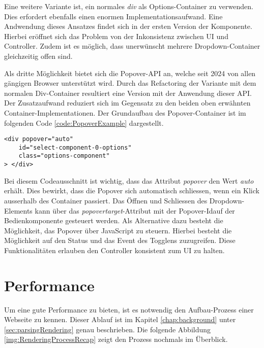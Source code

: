 Eine weitere Variante ist, ein normales \emph{div} als Options-Container zu verwenden.
Dies erfordert ebenfalls einen enormen Implementationsaufwand.
Eine Andwendung dieses Ansatzes findet sich in der ersten Version der Komponente.
Hierbei eröffnet sich das Problem von der Inkonsistenz zwischen UI und Controller.
Zudem ist es möglich, dass unerwünscht mehrere Dropdown-Container gleichzeitig offen sind.

Als dritte Möglichkeit bietet sich die Popover-API an, welche seit 2024 von allen gängigen Browser unterstützt wird.
Durch das Refactoring der Variante mit dem normalen Div-Container resultiert eine Version mit der Anwendung dieser API.
Der Zusatzaufwand reduziert sich im Gegensatz zu den beiden oben erwähnten Container-Implementationen.
Der Grundaufbau des Popover-Container ist im folgenden Code \ref{code:PopoverExample} dargestellt.

\begin{lstlisting}[style = htmlcssjs, caption = Popover-Container Beispiel, label = code:PopoverExample]
<div popover="auto"
    id="select-component-0-options" 
    class="options-component" 
> </div>
\end{lstlisting}

Bei diesem Codeausschnitt ist wichtig, dass das Attribut \emph{popover} den Wert \emph{auto} erhält.
Dies bewirkt, dass die Popover sich automatisch schliessen, wenn ein Klick ausserhalb des Container passiert.
Das Öffnen und Schliessen des Dropdown-Elements kann über das \emph{popovertarget}-Attribut mit der Popover-Id\footnotemark auf der Bedienkomponente gesteuert werden.
Als Alternative dazu besteht die Möglichkeit, das Popover über JavaScript zu steuern.
Hierbei besteht die Möglichkeit auf den Status und das Event des Togglens zuzugreifen.
Diese Funktionalitäten erlauben den Controller konsistent zum UI zu halten.


\section{Performance}
\label{sec:performance}

Um eine gute Performance zu bieten, ist es notwendig den Aufbau-Prozess einer Webseite zu kennen.
Dieser Ablauf ist im Kapitel \ref{chap:background} unter \ref{sec:parsingRendering} genau beschrieben.
Die folgende Abbildung \ref{img:RenderingProcessRecap} zeigt den Prozess nochmals im Überblick.

